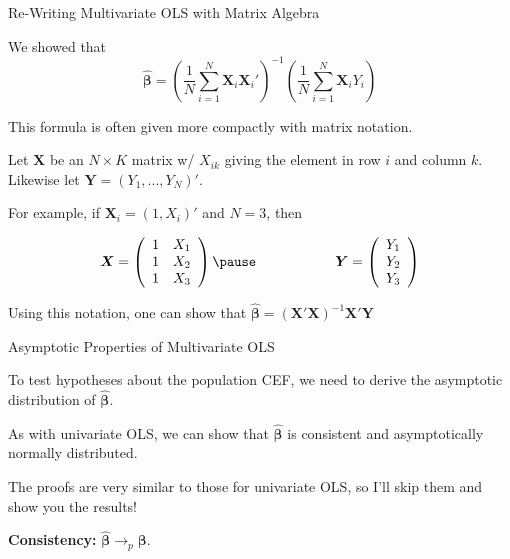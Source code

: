 \documentclass[11pt,english,handout]{beamer}
\newenvironment{wideitemize}{\itemize\addtolength{\itemsep}{10pt}}{\enditemize}
\begin{document}
	\begin{frame}{Re-Writing Multivariate OLS with Matrix Algebra}
		\begin{wideitemize}
		
		\item
		We showed that 
		$$ \bm{\hat\beta} = \left( \frac{1}{N} \sum_{i=1}^N \bm{X}_i \bm{X}_i' \right)^{-1}  \left( \frac{1}{N} \sum_{i=1}^N \bm{X}_i Y_i \right)$$
		
		\item
		This formula is often given more compactly with matrix notation.
		
		\pause
		\item
		Let $\bm{X}$ be an $N \times K$ matrix w/ $X_{ik}$ giving the element in row $i$ and column $k$. \pause Likewise let $\bm{Y} = (Y_1,...,Y_N)'$.
		
		\pause
		\item
		For example, if $\bm{X}_i = (1, X_i)'$ and $N=3$, then
		
		$$\bm{X} = \left( \begin{array}{rr} 1 & X_{1} \\ 1 & X_{2} \\ 1 & X_{3}   \end{array}  \right) \pause \hspace{2cm} \bm{Y} = \left( \begin{array}{r} Y_{1} \\Y_{2} \\ Y_{3}   \end{array}  \right)$$
		
		\pause
		\item
		Using this notation, one can show that $\bm{\hat\beta} = \left(\bm{X'X}\right)^{-1} \bm{X}'\bm{Y}$
	\end{wideitemize}	
		
	\end{frame}
	
	\begin{frame}{Asymptotic Properties of Multivariate OLS} 
		\begin{wideitemize}
			
		\item
		To test hypotheses about the population CEF, we need to derive the asymptotic distribution of $\bm{\hat\beta}$. 
		
		\pause
			
		\item
		As with univariate OLS, we can show that $\bm{\hat\beta}$ is consistent and asymptotically normally distributed.
		\pause
	
		\item
		The proofs are very similar to those for univariate OLS, so I'll skip them and show you the results!
		
		\pause
		\item
		\textbf{Consistency:} $\bm{\hat\beta} \rightarrow_p \bm{\beta}$.
		
		\end{wideitemize}
	\end{frame}
\end{document}
